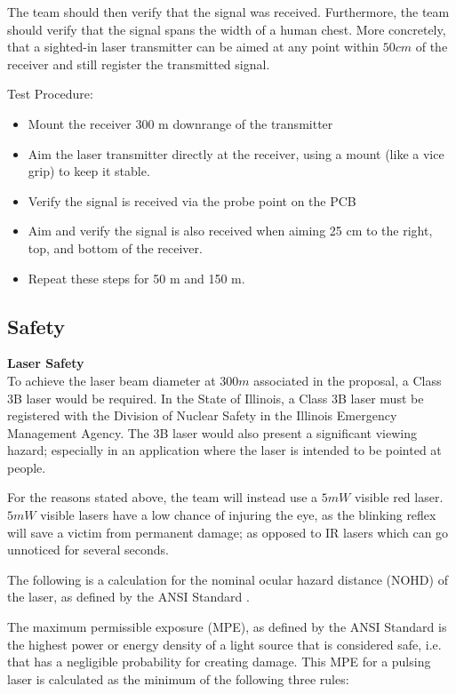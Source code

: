 \documentclass[letterpaper,10pt]{article}
\begin{document}
\begin{spacing}{1.15}
The team should then verify that the signal was received. Furthermore, the team should verify that the signal spans the width of a human chest. More concretely, that a sighted-in laser transmitter can be aimed at any point within $50 cm$ of the receiver and still register the transmitted signal. 

Test Procedure:

\begin{itemize}
	\item Mount the receiver 300 m downrange of the transmitter
	\item Aim the laser transmitter directly at the receiver, using a mount (like a vice grip) to keep it stable. 
	\item Verify the signal is received via the probe point on the PCB
	\item Aim and verify the signal is also received when aiming 25 cm to the right, top, and bottom of the receiver. 
	\item Repeat these steps for 50 m and 150 m. 
\end{itemize}



\subsection{Safety} \label{section-safety-ethics}
\normalsize\textbf{Laser Safety} \\
To achieve the laser beam diameter at $300 m$ associated in the proposal, a Class 3B laser would be required. In the State of Illinois, a Class 3B laser must be registered with the Division of Nuclear Safety in the Illinois Emergency Management Agency. The 3B laser would also present a significant viewing hazard; especially in an application where the laser is intended to be pointed at people. 

For the reasons stated above, the team will instead use a $5mW$ visible red laser. $5mW$ visible lasers have a low chance of injuring the eye, as the blinking reflex will save a victim from permanent damage; as opposed to IR lasers which can go unnoticed for several seconds. 

The following is a calculation for the nominal ocular hazard distance (NOHD) of the laser, as defined by the ANSI Standard \cite{ANSI}.

The maximum permissible exposure (MPE), as defined by the ANSI Standard \cite{ANSI} is the highest power or energy density of a light source that is considered safe, i.e. that has a negligible probability for creating damage. This MPE for a pulsing laser is calculated as the minimum of the following three rules:


\end{spacing}
\end{document}
